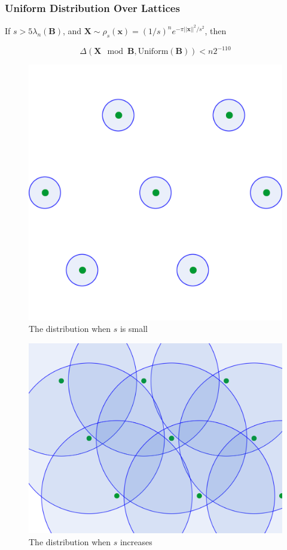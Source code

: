 \documentclass{beamer}
\begin{document}
	\subsubsection{Uniform Distribution Over Lattices}
	\begin{frame}
		\begin{theorem}
			If $s>5\lambda_n(\mathbf{B})$, and $\mathbf{X}\sim \rho_s(\mathbf{x})=(1/s)^ne^{-\pi ||\mathbf{x}||^2/s^2}$, then
			
			\begin{equation}
				\Delta(\mathbf{X}\mod{\mathbf{B}},\mathrm{Uniform }(\mathbf{B}))<n2^{-110}
			\end{equation}
			\label{thm:uniform_distribution}
		\end{theorem}
	\end{frame}
	\begin{frame}
		\begin{figure}[H]
			\centering
			\includegraphics[width=0.5\linewidth]{./image/gaussian_1.png}
			\caption{The distribution when $s$ is small}%
			\label{fig:gaussian_1}
		\end{figure}
	\end{frame}
	\begin{frame}
		\begin{figure}[H]
		\centering
		\includegraphics[width=0.5\linewidth]{./image/gaussian_2.png}
		\caption{The distribution when $s$ increases}%
		\label{fig:gaussian_2}
		\end{figure}
	\end{frame}
\end{document}
